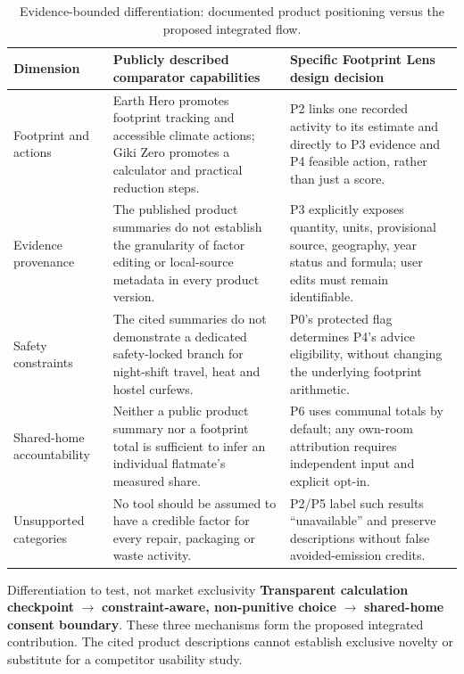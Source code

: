 \documentclass[12pt,a4paper]{article}
\begin{document}
\begin{table}[ht]
\centering\small
\caption{Evidence-bounded differentiation: documented product positioning versus the proposed integrated flow.}
\label{tab:competitor}
\begin{tabularx}{\textwidth}{@{}p{2.75cm}XX@{}}
\toprule
\textbf{Dimension}&\textbf{Publicly described comparator capabilities}&\textbf{Specific Footprint Lens design decision}\\
\midrule
Footprint and actions&Earth Hero promotes footprint tracking and accessible climate actions; Giki Zero promotes a calculator and practical reduction steps.&P2 links one recorded activity to its estimate and directly to P3 evidence and P4 feasible action, rather than just a score.\\
\rowcolor{RowGray}
Evidence provenance&The published product summaries do not establish the granularity of factor editing or local-source metadata in every product version.&P3 explicitly exposes quantity, units, provisional source, geography, year status and formula; user edits must remain identifiable.\\
Safety constraints&The cited summaries do not demonstrate a dedicated safety-locked branch for night-shift travel, heat and hostel curfews.&P0's protected flag determines P4's advice eligibility, without changing the underlying footprint arithmetic.\\
\rowcolor{RowGray}
Shared-home accountability&Neither a public product summary nor a footprint total is sufficient to infer an individual flatmate's measured share.&P6 uses communal totals by default; any own-room attribution requires independent input and explicit opt-in.\\
Unsupported categories&No tool should be assumed to have a credible factor for every repair, packaging or waste activity.&P2/P5 label such results ``unavailable'' and preserve descriptions without false avoided-emission credits.\\
\bottomrule
\end{tabularx}
\end{table}

\begin{insightbox}{Differentiation to test, not market exclusivity}
\textbf{Transparent calculation checkpoint} $\rightarrow$ \textbf{constraint-aware, non-punitive choice} $\rightarrow$ \textbf{shared-home consent boundary}. These three mechanisms form the proposed integrated contribution. The cited product descriptions cannot establish exclusive novelty or substitute for a competitor usability study.
\end{insightbox}
\end{document}
